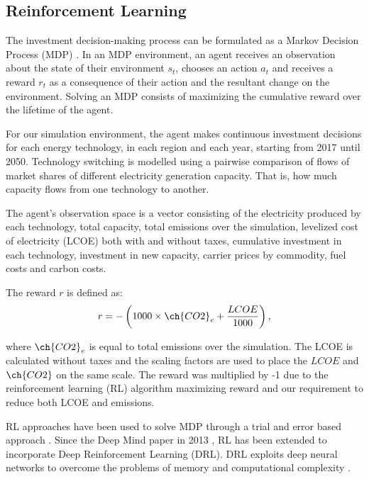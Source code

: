\documentclass{article}
\begin{document}
\subsection*{Reinforcement Learning}

The investment decision-making process can be formulated as a Markov Decision Process (MDP) \cite{puterman2014markov}. In an MDP environment, an agent receives an observation about the state of their environment $s_t$, chooses an action $a_t$ and receives a reward $r_t$ as a consequence of their action and the resultant change on the environment. Solving an MDP consists of maximizing the cumulative reward over the lifetime of the agent. 


For our simulation environment, the agent makes continuous investment decisions for each energy technology, in each region and each year, starting from 2017 until 2050. Technology switching is modelled using a pairwise comparison of flows of market shares of different electricity generation capacity. That is, how much capacity flows from one technology to another. 

The agent's observation space is a vector consisting of the electricity produced by each technology, total capacity, total  emissions over the simulation, levelized cost of electricity (LCOE) both with and without taxes, cumulative investment in each technology, investment in new capacity, carrier prices by commodity, fuel costs and carbon costs.

The reward $r$ is defined as:
\begin{equation}
\label{eq:reward_function}
	r = -\left(1000\times\ch{CO2}_e + \frac{LCOE}{1000}\right),
\end{equation}

where $\ch{CO2}_e$ is equal to total  emissions over the simulation. The LCOE is calculated without taxes and the scaling factors are used to place the $LCOE$ and $\ch{CO2}$ on the same scale. The reward was multiplied by -1 due to the reinforcement learning (RL) algorithm maximizing reward and our requirement to reduce both LCOE and  emissions.


RL approaches have been used to solve MDP through a trial and error based approach \cite{Sutton2015}. Since the Deep Mind paper in 2013 \cite{Arulkumaran2017}, RL has been extended to incorporate Deep Reinforcement Learning (DRL). DRL exploits deep neural networks to overcome the problems of memory and computational complexity \cite{Arulkumaran2017}. 
\end{document}
